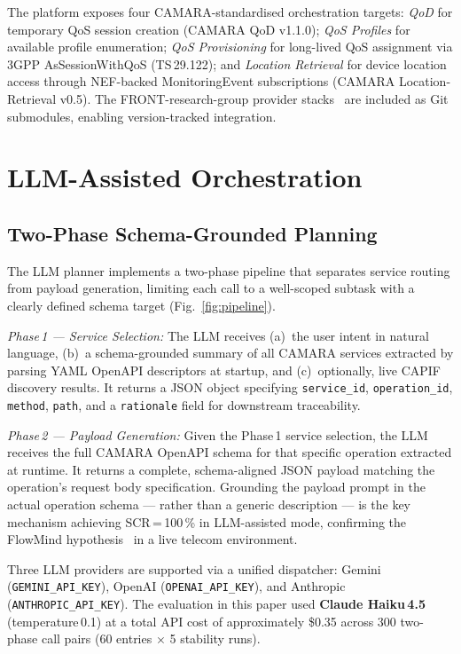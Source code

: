 \documentclass[conference]{IEEEtran}
\begin{document}
The platform exposes four CAMARA-standardised orchestration targets:
\textit{QoD} for temporary QoS session creation (CAMARA QoD v1.1.0);
\textit{QoS Profiles} for available profile enumeration;
\textit{QoS Provisioning} for long-lived QoS assignment via 3GPP
AsSessionWithQoS (TS\,29.122); and \textit{Location Retrieval}
for device location access through NEF-backed MonitoringEvent
subscriptions (CAMARA Location-Retrieval v0.5).
The FRONT-research-group provider stacks~\cite{turkovic2025} are
included as Git submodules, enabling version-tracked integration.

\section{LLM-Assisted Orchestration}
\label{sec:llm}

\subsection{Two-Phase Schema-Grounded Planning}

The LLM planner implements a two-phase pipeline that separates service
routing from payload generation, limiting each call to a well-scoped
subtask with a clearly defined schema target (Fig.~\ref{fig:pipeline}).

\textit{Phase\,1 --- Service Selection:}
The LLM receives (a)~the user intent in natural language,
(b)~a schema-grounded summary of all CAMARA services extracted by
parsing YAML OpenAPI descriptors at startup, and (c)~optionally,
live CAPIF discovery results.
It returns a JSON object specifying \texttt{service\_id},
\texttt{operation\_id}, \texttt{method}, \texttt{path}, and a
\texttt{rationale} field for downstream traceability.

\textit{Phase\,2 --- Payload Generation:}
Given the Phase\,1 service selection, the LLM receives the full CAMARA
OpenAPI schema for that specific operation extracted at runtime.
It returns a complete, schema-aligned JSON payload matching the
operation's request body specification.
Grounding the payload prompt in the actual operation schema --- rather
than a generic description --- is the key mechanism achieving
SCR\,=\,100\,\% in LLM-assisted mode, confirming the FlowMind
hypothesis~\cite{flowmind2023} in a live telecom environment.

Three LLM providers are supported via a unified dispatcher:
Gemini (\texttt{GEMINI\_API\_KEY}),
OpenAI (\texttt{OPENAI\_API\_KEY}),
and Anthropic (\texttt{ANTHROPIC\_API\_KEY}).
The evaluation in this paper used \textbf{Claude Haiku\,4.5}
(temperature\,0.1) at a total API cost of approximately \$0.35 across
300 two-phase call pairs (60 entries $\times$ 5 stability runs).
\end{document}
